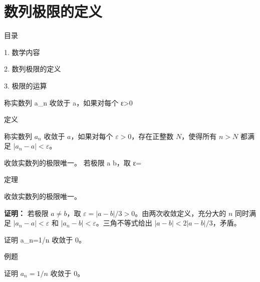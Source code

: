 \documentclass[aspectratio=169,10pt,fontset=fandol]{ctexbeamer}
\makeatletter
\newcommand{\mathagentsectionlabelcontext}{%
\protected@edef\@currentlabel{\thesection}%
\edef\@currentHref{Outline\the\c@part.\the\c@section}%
}
\makeatother
\begin{document}
\section{数列极限的定义}
\begin{frame}[t,fragile]{目录}
\normalsize
{\color{black}\normalsize 1. 数学内容\par}\vspace{0.22em}
{\color{blue}\normalsize 2. 数列极限的定义\par}\vspace{0.22em}
{\color{gray!40}\normalsize 3. 极限的运算\par}\vspace{0.22em}
\end{frame}
\begin{frame}[t,fragile]{称实数列 a\_n 收敛于 a，如果对每个 ε>0}
\normalsize
{\normalsize
\mathagentsectionlabelcontext
\label{sec:S01}

}
\begin{block}{定义}
{\normalsize
称实数列 $a_n$ 收敛于 $a$，如果对每个 $\varepsilon>0$，存在正整数 $N$，使得所有 $n>N$ 都满足 $|a_n-a|<\varepsilon$。

}
\end{block}
\end{frame}
\begin{frame}[t,fragile]{收敛实数列的极限唯一。 若极限 a b，取 ε=}
\normalsize
\begin{block}{定理}
{\normalsize
收敛实数列的极限唯一。

}
\end{block}
\pause
{\normalsize
\textbf{证明：}
若极限 $a\ne b$，取 $\varepsilon=|a-b|/3>0$。由两次收敛定义，充分大的 $n$ 同时满足 $|a_n-a|<\varepsilon$ 和 $|a_n-b|<\varepsilon$。三角不等式给出 $|a-b|<2|a-b|/3$，矛盾。

}
\end{frame}
\begin{frame}[t,fragile]{证明 a\_n=1/n 收敛于 0。}
\normalsize
\begin{block}{例题}
{\normalsize
证明 $a_n=1/n$ 收敛于 $0$。

}
\end{block}
\end{frame}
\end{document}
